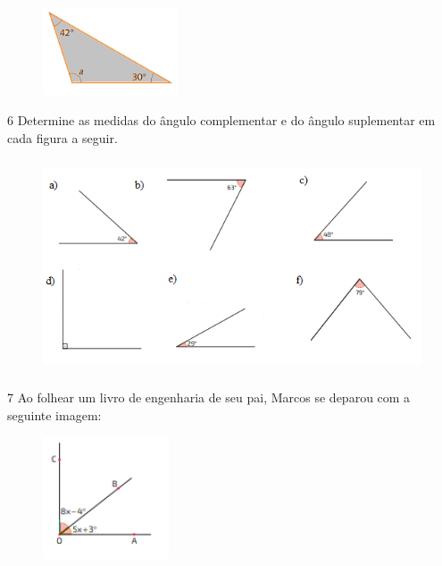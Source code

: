 \begin{escolha}
\begin{figure}[H]
\end{figure}
\item
\begin{figure}[H]
\centering\includegraphics[width=4cm]{./imgSAEB_8_MAT/media/image29.png}
\end{figure}
\end{escolha}








\num{6} Determine as medidas do ângulo complementar e do ângulo suplementar
em cada figura a seguir.

\begin{figure}[H]
\centering\includegraphics[width=4.81667in,height=2.48373in]{./imgSAEB_8_MAT/media/image30.png}
\end{figure}


\num{7} Ao folhear um livro de engenharia de seu pai, Marcos se deparou com a
seguinte imagem:

\begin{figure}[H]
\centering\includegraphics[width=1.47134in,height=1.42708in]{./imgSAEB_8_MAT/media/image31.png}
\end{figure}

